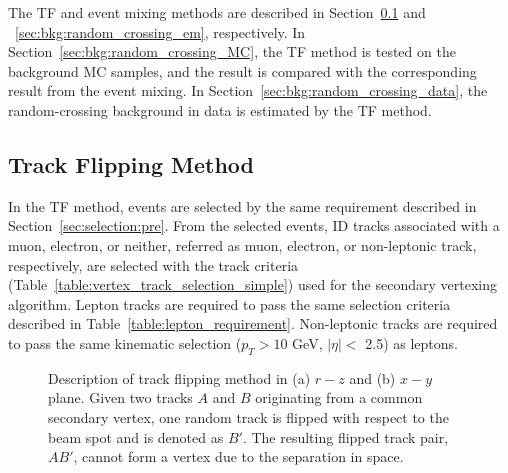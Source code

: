 The TF and event mixing methods are described in Section~\ref{sec:bkg:random_crossing_tf} and ~\ref{sec:bkg:random_crossing_em}, respectively. In Section~\ref{sec:bkg:random_crossing_MC}, the TF method is tested on the background MC samples, and the result is compared with the corresponding result from the event mixing. In Section~\ref{sec:bkg:random_crossing_data}, the random-crossing background in data is estimated by the TF method.%

\subsection{Track Flipping Method}
\label{sec:bkg:random_crossing_tf}

In the TF method, events are selected by the same requirement described in Section~\ref{sec:selection:pre}. From the selected events, ID tracks associated with a muon, electron, or neither, referred as muon, electron, or non-leptonic track, respectively, are selected with the track criteria (Table~\ref{table:vertex_track_selection_simple}) used for the secondary vertexing algorithm. Lepton tracks are required to pass the same selection criteria described in Table~\ref{table:lepton_requirement}. Non-leptonic tracks are required to pass the same kinematic selection ($p_{T} > 10$ GeV, $|\eta| < $ 2.5) as leptons.

\begin{figure}[!htb]
	\centering
	\caption{Description of track flipping method in (a) $r-z$ and (b) $x-y$ plane. Given two tracks $A$ and $B$ originating from a common secondary vertex, one random track is flipped with respect to the beam spot and is denoted as $B'$. The resulting flipped track pair, $AB'$, cannot form a vertex due to the separation in space.}
	\label{fig:TF_diagram}
\end{figure}

